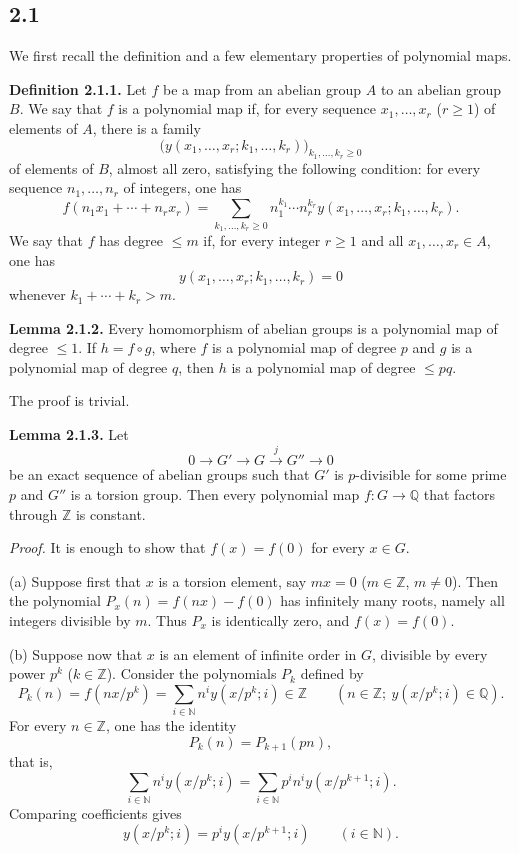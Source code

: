 \subsection*{2.1}
We first recall the definition and a few elementary properties of polynomial
maps.

\textbf{Definition 2.1.1.}
Let $f$ be a map from an abelian group $A$ to an abelian group $B$. We say
that $f$ is a polynomial map if, for every sequence $x_1,\ldots,x_r$
($r\geq1$) of elements of $A$, there is a family
\[
\bigl(y(x_1,\ldots,x_r;k_1,\ldots,k_r)\bigr)_{k_1,\ldots,k_r\geq0}
\]
of elements of $B$, almost all zero, satisfying the following condition: for
every sequence $n_1,\ldots,n_r$ of integers, one has
\[
f(n_1x_1+\cdots+n_rx_r)=
\sum_{k_1,\ldots,k_r\geq0}
n_1^{k_1}\cdots n_r^{k_r}
y(x_1,\ldots,x_r;k_1,\ldots,k_r).
\]
We say that $f$ has degree $\leq m$ if, for every integer $r\geq1$ and all
$x_1,\ldots,x_r\in A$, one has
\[
y(x_1,\ldots,x_r;k_1,\ldots,k_r)=0
\]
whenever $k_1+\cdots+k_r>m$.

\textbf{Lemma 2.1.2.}
Every homomorphism of abelian groups is a polynomial map of degree $\leq1$.
If $h=f\circ g$, where $f$ is a polynomial map of degree $p$ and $g$ is a
polynomial map of degree $q$, then $h$ is a polynomial map of degree
$\leq pq$.

The proof is trivial.

\textbf{Lemma 2.1.3.}
Let
\[
0\longrightarrow G'\longrightarrow G\xrightarrow{j}G''\longrightarrow0
\]
be an exact sequence of abelian groups such that $G'$ is $p$-divisible for
some prime $p$ and $G''$ is a torsion group. Then every polynomial map
$f:G\to\mathbb Q$ that factors through $\mathbb Z$ is constant.

\emph{Proof.}
It is enough to show that $f(x)=f(0)$ for every $x\in G$.

(a) Suppose first that $x$ is a torsion element, say $mx=0$
($m\in\mathbb Z$, $m\ne0$). Then the polynomial
$P_x(n)=f(nx)-f(0)$ has infinitely many roots, namely all integers divisible
by $m$. Thus $P_x$ is identically zero, and $f(x)=f(0)$.

(b) Suppose now that $x$ is an element of infinite order in $G$, divisible by every power
$p^k$ ($k\in\mathbb Z$). Consider the polynomials $P_k$ defined by
\[
P_k(n)=f(nx/p^k)=\sum_{i\in\mathbb N}n^iy(x/p^k;i)\in\mathbb Z
\qquad(n\in\mathbb Z;\ y(x/p^k;i)\in\mathbb Q).
\]
For every $n\in\mathbb Z$, one has the identity
\[
P_k(n)=P_{k+1}(pn),
\]
that is,
\[
\sum_{i\in\mathbb N}n^iy(x/p^k;i)=
\sum_{i\in\mathbb N}p^in^iy(x/p^{k+1};i).
\]
Comparing coefficients gives
\[
y(x/p^k;i)=p^iy(x/p^{k+1};i)\qquad(i\in\mathbb N).
\]

